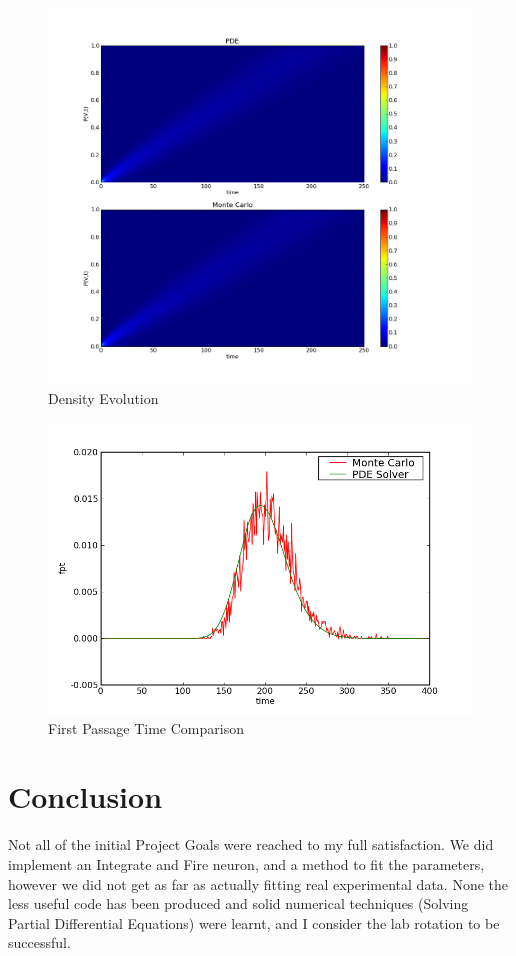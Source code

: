 \documentclass[10pt]{article}
\begin{document}
\begin{figure}[htp]
\centering
\includegraphics[scale=0.60]{P_vt}
\caption{Density Evolution}
\label{P_vt}
\end{figure}

\begin{figure}[htp]
\centering
\includegraphics[scale=0.60]{fpt.png}
\caption{First Passage Time Comparison}
\label{fpt}
\end{figure}

\section{Conclusion}

Not all of the initial Project Goals were reached to my full
satisfaction. We did implement an Integrate and Fire
neuron, and a method to fit the parameters, however we did not get as
far as actually fitting real experimental data. None the less 
useful code has been produced and solid numerical techniques (Solving
Partial Differential Equations) were
learnt, and I consider the lab rotation to be successful. 

{  }
\end{document}
